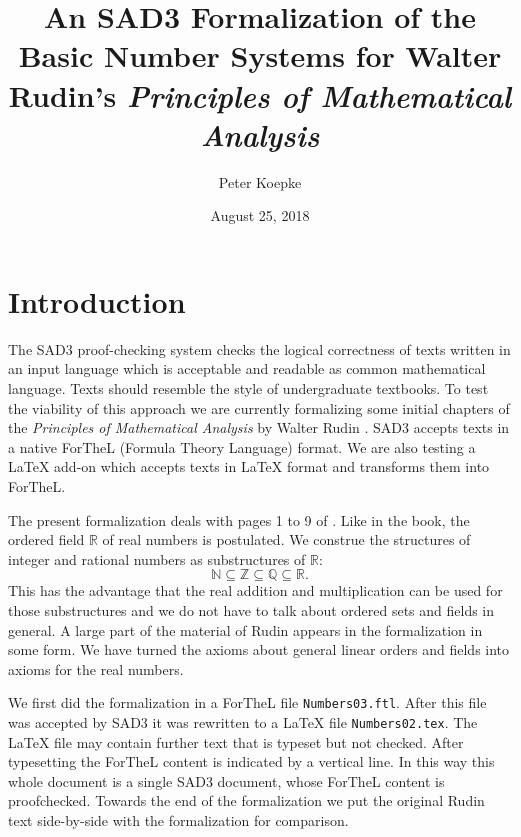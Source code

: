 \documentclass{article}
\newcommand{\RR}{\mathbb{R}}
\newcommand{\QQ}{\mathbb{Q}}
\newcommand{\ZZ}{\mathbb{Z}}
\newcommand{\NN}{\mathbb{N}}
\begin{document}
\title{An SAD3 Formalization of the Basic Number Systems for Walter Rudin's
\it{Principles of Mathematical Analysis}}

\author{Peter Koepke}

\date{August 25, 2018}

\maketitle


\section{Introduction}

The SAD3 proof-checking system checks the logical correctness of texts written in an input language which is acceptable and readable as common mathematical language. Texts should resemble the style of undergraduate textbooks. To test the viability of this approach we are currently formalizing some initial chapters of the {\it Principles of Mathematical Analysis} by Walter Rudin \cite{Rudin}. SAD3 accepts texts in a native ForTheL (Formula Theory Language) format. We are also testing a {\LaTeX} add-on which accepts texts in {\LaTeX} format and transforms them into ForTheL.

The present formalization deals with pages 1 to 9 of \cite{Rudin}. Like in the book, the ordered field $\mathbb{R}$ of real numbers is postulated. We construe the structures of integer and rational numbers as substructures of $\mathbb{R}$:
$$\NN \subseteq \ZZ \subseteq \QQ \subseteq \RR.$$
This has the advantage that the real addition and multiplication can be used for those substructures and we do not have to talk about ordered sets and fields in general. A large part of the material of Rudin appears in the formalization in some form. We have turned the axioms about general linear orders and fields into axioms for the real numbers.



We first did the formalization in a ForTheL file {\tt Numbers03.ftl}. After this file was accepted by SAD3 it was rewritten to a {\LaTeX} file
{\tt Numbers02.tex}. The {\LaTeX} file may contain further text that is typeset but not checked. After typesetting the ForTheL content is indicated by a vertical line.  In this way this whole document is a single SAD3 document, whose ForTheL content is proofchecked. Towards the end of the formalization we put the original Rudin text side-by-side with the formalization for comparison.
\end{document}
